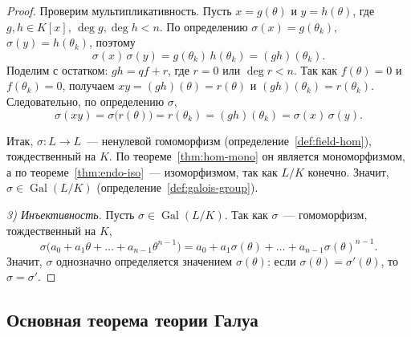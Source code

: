 \documentclass[12pt]{article}
\begin{document}
\begin{proof}
		Проверим мультипликативность. Пусть $x = g(\theta)$ и $y = h(\theta)$, где $g, h \in K[x]$, $\deg g, \deg h < n$. По определению $\sigma(x) = g(\theta_k)$, $\sigma(y) = h(\theta_k)$, поэтому
		\[
			\sigma(x)\,\sigma(y) = g(\theta_k)\,h(\theta_k) = (gh)(\theta_k).
		\]
		Поделим с остатком: $gh = qf + r$, где $r = 0$ или $\deg r < n$. Так как $f(\theta) = 0$ и $f(\theta_k) = 0$, получаем $xy = (gh)(\theta) = r(\theta)$ и $(gh)(\theta_k) = r(\theta_k)$. Следовательно, по определению $\sigma$,
		\[
			\sigma(xy) = \sigma\bigl(r(\theta)\bigr) = r(\theta_k) = (gh)(\theta_k) = \sigma(x)\,\sigma(y).
		\]

		Итак, $\sigma: L \to L$~--- ненулевой гомоморфизм (определение~\ref{def:field-hom}), тождественный на $K$. По теореме~\ref{thm:hom-mono} он является мономорфизмом, а по теореме~\ref{thm:endo-iso}~--- изоморфизмом, так как $L/K$ конечно. Значит, $\sigma \in \operatorname{Gal}(L/K)$ (определение~\ref{def:galois-group}).

		\emph{3) Инъективность.} Пусть $\sigma \in \operatorname{Gal}(L/K)$. Так как $\sigma$~--- гомоморфизм, тождественный на $K$,
		\[
			\sigma\bigl( a_0 + a_1\theta + \ldots + a_{n-1}\theta^{n-1} \bigr) = a_0 + a_1\sigma(\theta) + \ldots + a_{n-1}\sigma(\theta)^{n-1}.
		\]
		Значит, $\sigma$ однозначно определяется значением $\sigma(\theta)$: если $\sigma(\theta) = \sigma'(\theta)$, то $\sigma = \sigma'$.
	\end{proof}

	\subsection{Основная теорема теории Галуа}
\end{document}

